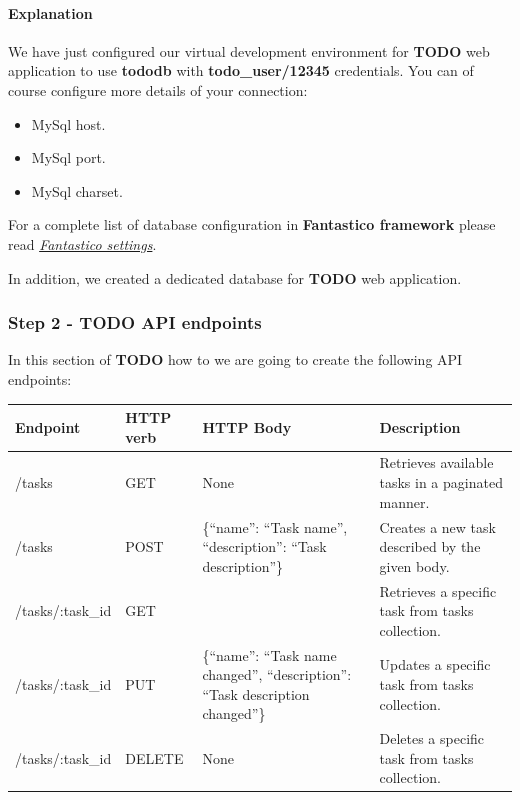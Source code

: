 \documentclass[letterpaper,10pt,english]{sphinxmanual}
\begin{document}
\paragraph{Explanation}
\label{how_to/todo/step_1_settings:explanation}
We have just configured our virtual development environment for \textbf{TODO} web application to use \textbf{tododb} with
\textbf{todo\_user/12345} credentials. You can of course configure more details of your connection:
\begin{itemize}
\item {} 
MySql host.

\item {} 
MySql port.

\item {} 
MySql charset.

\end{itemize}

For a complete list of database configuration in \textbf{Fantastico framework} please read {\hyperref[get_started/settings::doc]{\emph{Fantastico settings}}}.

In addition, we created a dedicated database for \textbf{TODO} web application.


\subsubsection{Step 2 - TODO API endpoints}
\label{how_to/todo/step_2_create_api:step-2-todo-api-endpoints}\label{how_to/todo/step_2_create_api::doc}
In this section of \textbf{TODO} how to we are going to create the following API endpoints:

\begin{tabulary}{\linewidth}{|L|L|L|L|}
\hline

\textbf{Endpoint}
 & 
\textbf{HTTP verb}
 & 
\textbf{HTTP Body}
 & 
\textbf{Description}
\\\hline

/tasks
 & 
GET
 & 
None
 & 
Retrieves available tasks in a paginated manner.
\\\hline

/tasks
 & 
POST
 & 
\{``name'': ``Task name'', ``description'': ``Task description''\}
 & 
Creates a new task described by the given body.
\\\hline

/tasks/:task\_id
 & 
GET
 &  & 
Retrieves a specific task from tasks collection.
\\\hline

/tasks/:task\_id
 & 
PUT
 & 
\{``name'': ``Task name changed'', ``description'': ``Task description changed''\}
 & 
Updates a specific task from tasks collection.
\\\hline

/tasks/:task\_id
 & 
DELETE
 & 
None
 & 
Deletes a specific task from tasks collection.
\\\hline
\end{tabulary}
\end{document}
